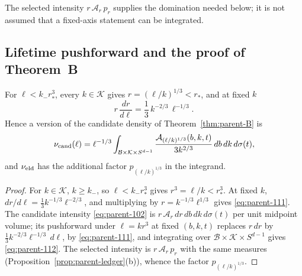 The selected intensity $r\,\mathcal A_r\,p_r$ supplies the domination needed below; it is not assumed that a fixed-axis statement can be integrated.

\subsection{Lifetime pushforward and the proof of Theorem~B}\label{ssec:parent-B}

\begin{proposition}\label{prop:parent-push}
For $\ell<k_-r_*^3$, every $k\in\mathcal K$ gives $r=(\ell/k)^{1/3}<r_*$, and at fixed $k$
\begin{equation}\label{eq:parent-111}
r\,\frac{dr}{d\ell}=\frac13\,k^{-2/3}\,\ell^{-1/3}.
\end{equation}
Hence a version of the candidate density of Theorem~\ref{thm:parent-B} is
\begin{equation}\label{eq:parent-112}
\nu_{\mathrm{cand}}(\ell)=\ell^{-1/3}\int_{\mathcal B\times\mathcal K\times S^{d-1}}\frac{\mathcal A_{(\ell/k)^{1/3}}(b,k,t)}{3k^{2/3}}\,db\,dk\,d\sigma(t),
\end{equation}
and $\nu_{\mathrm{eld}}$ has the additional factor $p_{(\ell/k)^{1/3}}$ in the integrand.
\end{proposition}

\begin{proof}
For $k\in\mathcal K$, $k\ge k_-$, so $\ell<k_-r_*^3$ gives $r^3=\ell/k<r_*^3$. At fixed $k$, $dr/d\ell=\frac13k^{-1/3}\ell^{-2/3}$, and multiplying by $r=k^{-1/3}\ell^{1/3}$ gives \eqref{eq:parent-111}. The candidate intensity \eqref{eq:parent-102} is $r\,\mathcal A_r\,dr\,db\,dk\,d\sigma(t)$ per unit midpoint volume; its pushforward under $\ell=kr^3$ at fixed $(b,k,t)$ replaces $r\,dr$ by $\frac13k^{-2/3}\ell^{-1/3}\,d\ell$, by \eqref{eq:parent-111}, and integrating over $\mathcal B\times\mathcal K\times S^{d-1}$ gives \eqref{eq:parent-112}. The selected intensity is $r\,\mathcal A_r\,p_r$ with the same measures (Proposition~\ref{prop:parent-ledger}(b)), whence the factor $p_{(\ell/k)^{1/3}}$.
\end{proof}

